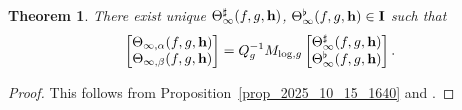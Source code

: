 \documentclass{amsart}
\numberwithin{equation}{section}
\newtheorem{theorem}{Theorem}[section]
\newcommand{\h}{\textup{\bf h}}
\begin{document}
\begin{theorem}
    \label{thm_2025_10_16_0900}
     There exist unique $\Theta_{\infty}^\sharp(f,g,\h)$, $\Theta_{\infty}^\flat(f,g,\h) \in \mathbf{I}$ such that
    \[
    \begin{bmatrix}
      \Theta_{\infty,\alpha}(f,g,\h)\\  
      \Theta_{\infty,\beta}(f,g,\h)\end{bmatrix}=Q_g^{-1}M_{\log,g}
\begin{bmatrix}
      \Theta_{\infty}^\sharp(f,g,\h)\\  
      \Theta_{\infty}^\flat(f,g,\h)
\end{bmatrix}    .
    \]
\end{theorem}
\begin{proof}
    This follows from Proposition~\ref{prop_2025_10_15_1640} and \cite[Theorem~3.4]{BBL1}.
\end{proof}   



 


\end{document}

